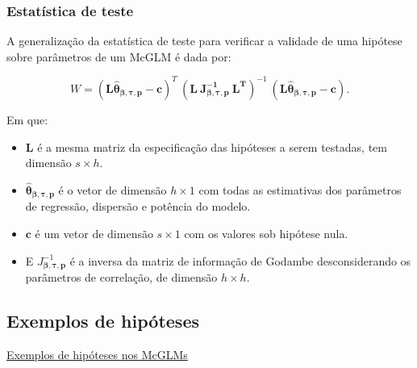 \documentclass[10pt,
  aspectratio=169,
  serif,
  mathserif,
  professionalfont,
  compress,
  handout,
  ]{beamer}\usepackage[]{graphicx}\usepackage[]{color}
\begin{document}

\begin{frame}
\frametitle{Estatística de teste}

A generalização da estatística de teste para verificar a validade de uma hipótese sobre parâmetros de um McGLM é dada por:

$$W = (\boldsymbol{L\hat\theta_{\beta,\tau,p}} - \boldsymbol{c})^T \ (\boldsymbol{L \ J_{\boldsymbol{{\beta,\tau,p}}}^{-1} \ L^T})^{-1} \ (\boldsymbol{L\hat\theta_{\beta,\tau,p}} - \boldsymbol{c}).$$

Em que: 

\begin{itemize}
  \item $\boldsymbol{L}$ é a mesma matriz da especificação das hipóteses a serem testadas, tem dimensão $s \times h$. 

  \item $\boldsymbol{\hat\theta_{\beta,\tau,p}}$ é o vetor de dimensão $h \times 1$ com todas as estimativas dos parâmetros de regressão, dispersão e potência do modelo. 

  \item $\boldsymbol{c}$ é um vetor de dimensão $s \times 1$ com os valores sob hipótese nula. 

  \item E $J_{\boldsymbol{{\beta,\tau,p}}}^{-1}$ é a inversa da matriz de informação de Godambe desconsiderando os parâmetros de correlação, de dimensão $h \times h$. 

\end{itemize}

\end{frame}


\subsection{Exemplos de hipóteses}


\begin{frame}[c, allowframebreaks]

\begin{center}

  {\normalsize \href{https://lineu96.github.io/st/}{Exemplos de hipóteses nos McGLMs}}
  
\end{center}

\end{frame}
\end{document}
